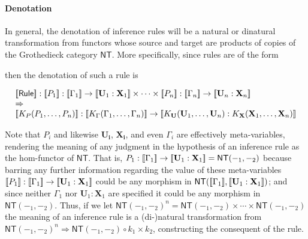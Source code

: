 \paragraph{Denotation}
In general, the denotation of inference rules will be a natural or dinatural transformation from functors whose source and target are products of copies of the Grothedieck category $\mathsf{NT}$. More specifically, since rules are of the form

\begin{mathpar}
\end{mathpar}

then the denotation of such a rule is

$$\begin{array}{l}
  \meaningof{\mathsf{Rule}} : \meaningof{P_{1}} : \meaningof{\Gamma_{1}} \to \meaningof{\mathbf{U}_{1} : \mathbf{X}_{1}} \times \cdots \times \meaningof{P_{n}} : \meaningof{\Gamma_{n}} \to \meaningof{\mathbf{U}_{n} : \mathbf{X}_{n}} \\\Rightarrow\\ \meaningof{K_{P}(P_{1},\ldots,P_{n})} : \meaningof{K_{\Gamma}(\Gamma_{1},\ldots,\Gamma_{n})} \to \meaningof{K_{\mathbf{U}}(\mathbf{U}_{1},\ldots,\mathbf{U}_{n}) : K_{\mathbf{X}}(\mathbf{X}_{1},\ldots,\mathbf{X}_{n})}
\end{array}$$

Note that $P_{i}$ and likewise $\mathbf{U_{i}}$, $\mathbf{X_{i}}$, and
even $\Gamma_{i}$ are effectively meta-variables, rendering the
meaning of any judgment in the hypothesis of an inference rule as the
hom-functor of $\mathsf{NT}$. That is, ${P_{1}} : \meaningof{\Gamma_{1}} \to \meaningof{\mathbf{U}_{1} : \mathbf{X}_{1}} = \mathsf{NT}(-_{1},-_{2})$ because barring any further information regarding the value of these meta-variables $\meaningof{P_{1}} : \meaningof{\Gamma_{1}} \to \meaningof{\mathbf{U}_{1} : \mathbf{X}_{1}}$ could be any morphism in $\mathsf{NT}(\meaningof{\Gamma_{1}},\meaningof{\mathbf{U}_{1} : \mathbf{X}_{1}})$; and since neither $\Gamma_{1}$ nor $\mathbf{U}_{1} : \mathbf{X}_{1}$ are specified it could be any morphism in $\mathsf{NT}(-_{1},-_{2})$. Thus, if we let $\mathsf{NT}(-_{1}, -_{2})^n = \mathsf{NT}(-_{1}, -_{2}) \times \cdots \times \mathsf{NT}(-_{1}, -_{2})$ the meaning of an inference rule is a (di-)natural transformation from $\mathsf{NT}(-_{1}, -_{2})^{n} \Rightarrow \mathsf{NT}(-_{1}, -_{2}) \circ k_{1} \times k_{2}$, constructing the consequent of the rule.

